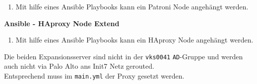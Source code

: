 \begin{flushleft}
\begin{description}
\begin{enumerate}[resume]
            \item Mit hilfe eines \Gls{Ansible} Playbooks kann ein Patroni Node angehängt werden.
        \end{enumerate}
        \item \textbf{Ansible - HAproxy Node Extend}\hfill \\
        \begin{enumerate}[resume]
            \item Mit hilfe eines \Gls{Ansible} Playbooks kann ein HAproxy Node angehängt werden.
        \end{enumerate}
    \end{description}
    \begin{warning}
        Die beiden Expansionsserver sind nicht in der \texttt{vks0041} \texttt{AD}-Gruppe und werden auch nicht via Palo Alto ans Init7 Netz gerouted.\\
        Entsprechend muss im \texttt{main.yml} der Proxy gesetzt werden.
    \end{warning}
\end{flushleft}